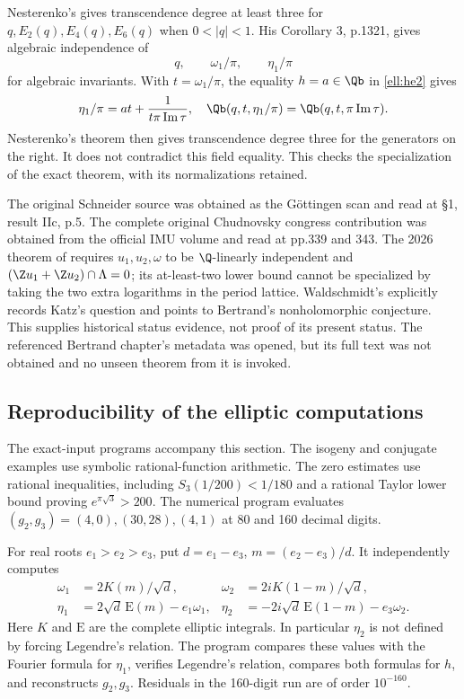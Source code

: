 Nesterenko's \cite[Theorem 1, p.1320]{EllNesterenko1996} gives transcendence degree at least three for $q,E_2(q),E_4(q),E_6(q)$ when $0<|q|<1$. His Corollary 3, p.1321, gives algebraic independence of
\[
 q,\qquad \omega_1/\pi,\qquad \eta_1/\pi
\]
for algebraic invariants. With $t=\omega_1/\pi$, the equality $h=a\in\Qb$ in \eqref{ell:he2} gives
\[
 \eta_1/\pi=at+\frac1{t\pi\operatorname{Im}\tau},
 \quad
 \Qb(q,t,\eta_1/\pi)=\Qb(q,t,\pi\operatorname{Im}\tau).
\]
Nesterenko's theorem then gives transcendence degree three for the generators on the right. It does not contradict this field equality. This checks the specialization of the exact theorem, with its normalizations retained.

The original Schneider source was obtained as the G\"ottingen scan and read at \S1, result IIc, p.5. The complete original Chudnovsky congress contribution was obtained from the official IMU volume and read at pp.339 and 343. The 2026 theorem of \cite[Theorem 1]{EllSenthilKumar2026} requires $u_1,u_2,\omega$ to be $\Q$-linearly independent and $(\Z u_1+\Z u_2)\cap\Lambda=0$; its at-least-two lower bound cannot be specialized by taking the two extra logarithms in the period lattice. Waldschmidt's \cite[\S3.3, p.31]{EllWaldschmidt2004} explicitly records Katz's question and points to Bertrand's nonholomorphic conjecture. This supplies historical status evidence, not proof of its present status. The referenced Bertrand chapter's metadata was opened, but its full text was not obtained and no unseen theorem from it is invoked.

\subsection{Reproducibility of the elliptic computations}

The exact-input programs accompany this section. The isogeny and conjugate examples use symbolic rational-function arithmetic. The zero estimates use rational inequalities, including $S_3(1/200)<1/180$ and a rational Taylor lower bound proving $e^{\pi\sqrt3}>200$. The numerical program evaluates $(g_2,g_3)=(4,0),(30,28),(4,1)$ at 80 and 160 decimal digits.

For real roots $e_1>e_2>e_3$, put $d=e_1-e_3$, $m=(e_2-e_3)/d$. It independently computes
\begin{align*}
 \omega_1&=2K(m)/\sqrt d,&
 \omega_2&=2iK(1-m)/\sqrt d,\\
 \eta_1&=2\sqrt d\,\mathrm E(m)-e_1\omega_1,&
 \eta_2&=-2i\sqrt d\,\mathrm E(1-m)-e_3\omega_2.
\end{align*}
Here $K$ and $\mathrm E$ are the complete elliptic integrals. In particular $\eta_2$ is not defined by forcing Legendre's relation. The program compares these values with the Fourier formula for $\eta_1$, verifies Legendre's relation, compares both formulas for $h$, and reconstructs $g_2,g_3$. Residuals in the 160-digit run are of order $10^{-160}$.

